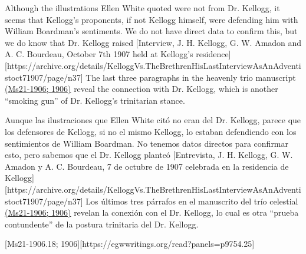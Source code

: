 Although the illustrations Ellen White quoted were not from Dr. Kellogg, it seems that Kellogg's proponents, if not Kellogg himself, were defending him with William Boardman's sentiments. We do not have direct data to confirm this, but we do know that Dr. Kellogg raised [Interview, J. H. Kellogg, G. W. Amadon and A. C. Bourdeau, October 7th 1907 held at Kellogg’s residence][https://archive.org/details/KelloggVs.TheBrethrenHisLastInterviewAsAnAdventistoct71907/page/n37] The last three paragraphs in the heavenly trio manuscript \href{https://egwwritings.org/?ref=en_Ms21-1906&para=9754.1}{(Ms21-1906; 1906)} reveal the connection with Dr. Kellogg, which is another “smoking gun” of Dr. Kellogg's trinitarian stance.


Aunque las ilustraciones que Ellen White citó no eran del Dr. Kellogg, parece que los defensores de Kellogg, si no el mismo Kellogg, lo estaban defendiendo con los sentimientos de William Boardman. No tenemos datos directos para confirmar esto, pero sabemos que el Dr. Kellogg planteó [Entrevista, J. H. Kellogg, G. W. Amadon y A. C. Bourdeau, 7 de octubre de 1907 celebrada en la residencia de Kellogg][https://archive.org/details/KelloggVs.TheBrethrenHisLastInterviewAsAnAdventistoct71907/page/n37] Los últimos tres párrafos en el manuscrito del trío celestial \href{https://egwwritings.org/?ref=en_Ms21-1906&para=9754.1}{(Ms21-1906; 1906)} revelan la conexión con el Dr. Kellogg, lo cual es otra “prueba contundente” de la postura trinitaria del Dr. Kellogg.


[Ms21-1906.18; 1906][https://egwwritings.org/read?panels=p9754.25]


